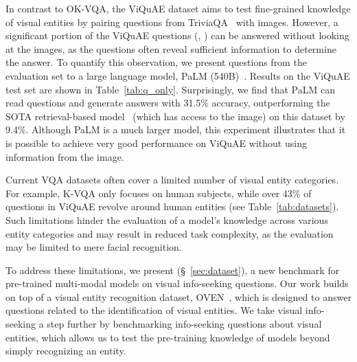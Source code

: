 \documentclass[11pt]{article}
\begin{document}
In contrast to OK-VQA, the ViQuAE dataset aims to test fine-grained knowledge of visual entities by pairing questions from TriviaQA~\cite{joshi-etal-2017-triviaqa} with images.
However, a significant portion of the ViQuAE questions {(\eg, )} can be answered without looking at the images, as the questions often reveal sufficient information to determine the answer. 
To quantify this observation, we present questions from the evaluation set to a large language model, PaLM (540B)~\cite{chowdhery2022palm}.
Results on the ViQuAE test set are shown in Table~\ref{tab:q_only}. Surprisingly, we find that PaLM can read questions and generate answers with 31.5\% accuracy, outperforming the SOTA retrieval-based model~\cite{viquae} (which has access to the image) on this dataset by 9.4\%.
Although PaLM is a much larger model, this experiment illustrates that it is possible to achieve very good performance on ViQuAE without using information from the image.

Current VQA datasets often cover a limited number of visual entity categories.
For example, K-VQA only focuses on human subjects, while over 43\% of questions in ViQuAE revolve around human entities (see Table~\ref{tab:datasets}).
Such limitations hinder the evaluation of a model's knowledge across various entity categories and may result in reduced task complexity, as the evaluation may be limited to mere facial recognition.

To address these limitations, we present \ourdataset (\S~\ref{sec:dataset}), a new benchmark for pre-trained multi-modal models on visual info-seeking questions.
Our work builds on top of a visual entity recognition dataset,
OVEN~\cite{hu2023opendomain}, which is designed to answer questions related to the identification of visual entities.
We take visual info-seeking a step further by benchmarking info-seeking questions about visual entities, which allows us to test the pre-training knowledge of models beyond simply recognizing an entity. 
 
\end{document}

